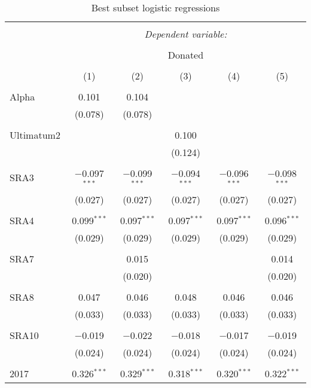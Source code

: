 \begin{table}[H] \centering 
  \caption{Best subset logistic regressions} 
  \label{} 
     \begin{adjustbox}{width=\textwidth, totalheight=\baselineskip}
\begin{tabular}{@{\extracolsep{5pt}}lccccc} 
\\[-1.8ex]\hline 
\hline \\[-1.8ex] 
 & \multicolumn{5}{c}{\textit{Dependent variable:}} \\ 
\cline{2-6} 
\\[-1.8ex] & \multicolumn{5}{c}{Donated} \\ 
\\[-1.8ex] & (1) & (2) & (3) & (4) & (5)\\ 
\hline \\[-1.8ex] 
 Alpha & 0.101 & 0.104 &  &  &  \\ 
  & (0.078) & (0.078) &  &  &  \\ 
  & & & & & \\ 
 Ultimatum2 &  &  & 0.100 &  &  \\ 
  &  &  & (0.124) &  &  \\ 
  & & & & & \\ 
 SRA3 & $-$0.097$^{***}$ & $-$0.099$^{***}$ & $-$0.094$^{***}$ & $-$0.096$^{***}$ & $-$0.098$^{***}$ \\ 
  & (0.027) & (0.027) & (0.027) & (0.027) & (0.027) \\ 
  & & & & & \\ 
 SRA4 & 0.099$^{***}$ & 0.097$^{***}$ & 0.097$^{***}$ & 0.097$^{***}$ & 0.096$^{***}$ \\ 
  & (0.029) & (0.029) & (0.029) & (0.029) & (0.029) \\ 
  & & & & & \\ 
 SRA7 &  & 0.015 &  &  & 0.014 \\ 
  &  & (0.020) &  &  & (0.020) \\ 
  & & & & & \\ 
 SRA8 & 0.047 & 0.046 & 0.048 & 0.046 & 0.046 \\ 
  & (0.033) & (0.033) & (0.033) & (0.033) & (0.033) \\ 
  & & & & & \\ 
 SRA10 & $-$0.019 & $-$0.022 & $-$0.018 & $-$0.017 & $-$0.019 \\ 
  & (0.024) & (0.024) & (0.024) & (0.024) & (0.024) \\ 
  & & & & & \\ 
 2017 & 0.326$^{***}$ & 0.329$^{***}$ & 0.318$^{***}$ & 0.320$^{***}$ & 0.322$^{***}$ \\ 

\end{tabular}
\end{adjustbox}
\end{table}
